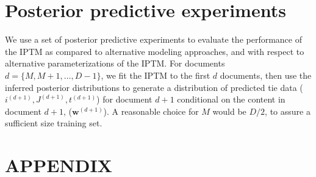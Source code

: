 \documentclass[a4paper]{article}
\begin{document}
 \section{Posterior predictive experiments}
 
 We use a set of posterior predictive experiments to evaluate the performance of the IPTM as compared to alternative modeling approaches, and with respect to alternative parameterizations of the IPTM. For documents $d=\{M,M+1,\hdots,D-1\}$, we fit the IPTM to the first $d$ documents, then use the inferred posterior distributions to generate a distribution of predicted tie data ($i^{(d+1)}, J^{(d+1)}, t^{(d+1)}$) for document $d+1$ conditional on the content in document $d+1$, ($\boldsymbol{w}^{(d+1)}$).  A reasonable choice for $M$ would be $D/2$, to assure a sufficient size training set.
 
  


\newpage
\appendix
 \section*{APPENDIX}
 \renewcommand{\thesubsection}{\Alph{subsection}}
 \iffalse
\end{document}
